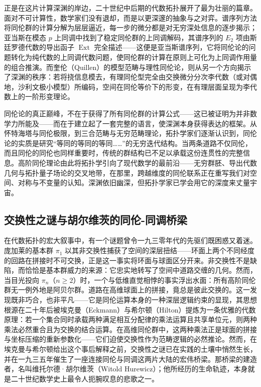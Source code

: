 \documentclass[12pt,a4paper]{article}
\begin{document}
正是在这片计算深渊的岸边，二十世纪中后期的代数拓扑展开了最为壮丽的篇章。面对不可计算性，数学家们没有退却，而是以更深邃的抽象与之对弈。谱序列方法将同伦群的计算分解为层层逼近，每一步的微分都是对无穷深处信息的逐步揭示；亚当斯在模态 $p$ 上同调中找到了稳定同伦群的上同调解码，其谱序列的 $E_2$ 项由斯廷罗德代数的导出函子 $\operatorname{Ext}$ 完全描述——这便是亚当斯谱序列，它将同伦论的问题转化为纯代数的上同调代数问题，使同伦群的计算在原则上可化为上同调作用量的组合推演。而奎伦（Quillen）的模型范畴与理性同伦论，则从另一个方向揭示了深渊的秩序：若将挠信息模去，有理同伦型完全由交换微分分次李代数（或对偶地，沙利文极小模型）所编码，空间在同伦等价下的形变，在有理层面呈现为李代数上的一阶形变理论。

同伦论的真正巅峰，不在于获得了所有同伦群的计算公式——这已被证明为并非数学力所能及——而在于建立起了一套完整的语言，使深渊本身获得表达的框架。从怀特海塔与同伦极限，到三合范畴与无穷范畴理论，拓扑学家们逐渐认识到，同伦论的实质是研究“等同的等同的等同……”的无穷迭代结构。当两条道路不仅同伦，而且同伦的同伦也同样重要时，传统的群结构已不足以承载这份连贯性的完整信息。高阶同伦理论由此将拓扑学引向了现代数学的最前沿——无穷群胚、导出代数几何与拓扑量子场论的交叉地带，在那里，跨越维度的同伦联系正在重写我们对空间、对称与不变量的认知。深渊依旧幽深，但拓扑学家已学会用它的深度来丈量宇宙。

\subsection{交换性之谜与胡尔维茨的同伦-同调桥梁}


在代数拓扑的宏大叙事中，有一个谜题曾令一九三零年代的先驱们既困惑又着迷。庞加莱的基本群 $\pi_1$ 以其非交换性捕获了空间的深层扭结——环面上两个不同经度的回路在拼接时不可交换，正是这一事实将环面与球面区分开来。非交换性不是缺陷，而恰恰是基本群威力的来源：它忠实地转写了空间中道路交缠的几何。然而，当目光投向 $\pi_n$（$n \geq 2$）时，一个与低维直觉相悖的事实浮出水面：所有高阶同伦群无一例外地是阿贝尔群。道路在高维球面上的拼接，竟总是彼此交换的。这一发现既非巧合，也非平凡——它是同伦运算本身的一种深层逻辑约束的显现，其思想根源在二十年后被埃克曼（Eckmann）与希尔顿（Hilton）提炼为一条优雅的代数原理：若一个集合同时承载两种满足相互分配律的乘法运算且共享单位元，则两种乘法必然重合且为交换的结合运算。在高维同伦群中，这两种乘法正是球面的拼接与坐标压缩的重新参数化——它们迫使交换性作为范畴逻辑的必然推论。然而，在埃克曼与希尔顿给出这个事后解释之前，交换性之谜已在实践的土壤中悄然生长，并在一九三五年催生了一座连接同伦与同调这两片大陆的宏伟桥梁。那桥梁的建造者，名叫维托尔德·胡尔维茨（Witold Hurewicz）；他所经历的生命轨迹，本身就是二十世纪数学史上最令人扼腕叹息的悲歌之一。
\end{document}
